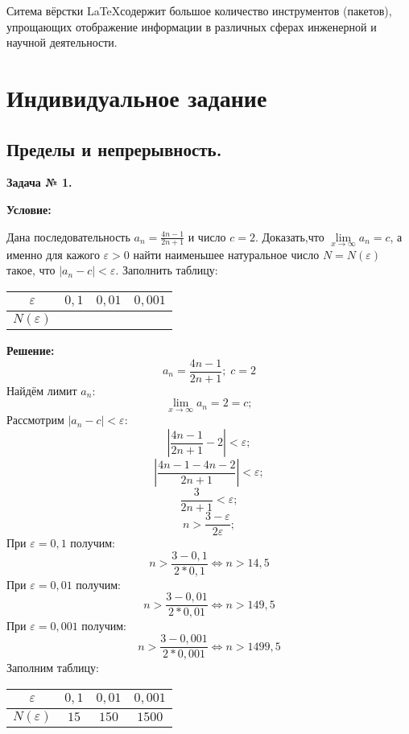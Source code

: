 \documentclass[12pt]{article}
\newcommand{\eps}{\varepsilon}
\begin{document}
Ситема вёрстки \LaTeX содержит большое количество инструментов (пакетов), упрощающих отображение информации в различных 
сферах инженерной и научной деятельности. 

\newpage
\section{Индивидуальное задание}



\subsection{Пределы и непрерывность.}

\begin{center}
\textbf{Задача № 1.}   
\end{center}

\textbf{Условие:}

Дана последовательность  $a_{n}=\frac{4n-1}{2n+1}$ и число $c=2$. Доказать,что $\lim\limits_{x\rightarrow\infty} a_{n}=c$, а именно для кажого $\eps > 0$ найти наименьшее натуральное число $N = N(\eps)$ такое, что $|a_{n}-c|<\eps$. Заполнить таблицу:
\begin{table}[h]
    \centering
    \begin{tabular}{|c|c|c|c|}
        \hline
         $\eps$ & $0,1$ & $0,01$ & $0,001$ \\
         \hline
         $N(\eps)$ &  &  & \\
         \hline
    \end{tabular}
\end{table}

\textbf{Решение:}
$$a_{n}=\frac{4n-1}{2n+1}; \; c = 2$$ 
Найдём лимит $a_{n}$:
$$\lim\limits_{x\rightarrow\infty} a_{n}= 2 = c;$$
Рассмотрим  $|a_{n}-c|<\eps$:
$$|\frac{4n-1}{2n+1} - 2| <\eps;$$
$$|\frac{4n-1-4n-2}{2n+1}| <\eps;$$
$$\frac{3}{2n+1} < \eps;$$
$$n > \frac{3-\eps}{2\eps};$$
При $\eps = 0,1$ получим:
$$ n > \frac{3-0,1}{2*0,1} \Leftrightarrow n > 14,5$$
При $\eps = 0,01$ получим:
$$ n > \frac{3-0,01}{2*0,01} \Leftrightarrow n > 149,5$$
При $\eps = 0,001$ получим:
$$ n > \frac{3-0,001}{2*0,001} \Leftrightarrow n > 1499,5$$
Заполним таблицу:
\begin{table}[h]
    \centering
    \begin{tabular}{|c|c|c|c|}
        \hline
         $\eps$ & $0,1$ & $0,01$ & $0,001$ \\
         \hline
         $N(\eps)$ & $15$ & $150$  & $1500$ \\
         \hline
    \end{tabular}
\end{table}
\end{document}
